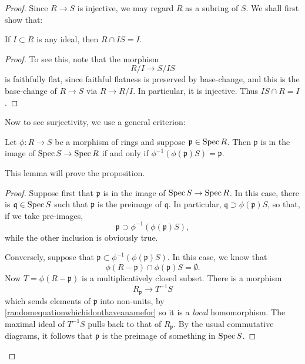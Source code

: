 \begin{proof} Since $R \to S$ is injective, we may regard $R$ as a subring of $S$.
We shall first show that:

\begin{lemma} \label{intideal}
If $I \subset R$ is any ideal, then $R \cap IS = I$.
\end{lemma}
\begin{proof} 
To see this, note that the morphism
\[ R/I \to S/IS  \]
is faithfully flat, since faithful flatness is preserved by base-change, and
this is the base-change of $R \to S$ via $R \to R/I$.
In particular, it is injective. Thus $IS \cap R = I$.
\end{proof} 


Now to see surjectivity, we use a general criterion:

\begin{lemma} \label{imagespec}
Let $\phi: R \to S$ be a morphism of rings and suppose $\mathfrak{p} \in \operatorname{Spec}
R$. Then $\mathfrak{p}$ is in the image of $\operatorname{Spec} S \to \operatorname{Spec} R$ if and only if 
$\phi^{-1}( \phi(\mathfrak{p}) S) = \mathfrak{p}$.
\end{lemma} 

This lemma will prove the proposition.
\begin{proof} 
Suppose first that $\mathfrak{p}$ is in the image of $\operatorname{Spec} S \to \operatorname{Spec} R$. In
this case, there is $\mathfrak{q} \in \operatorname{Spec} S$ such that
$ \mathfrak{p}$ is the preimage of $\mathfrak{q}$.
In particular, $\mathfrak{q} \supset \phi(\mathfrak{p})S$, so that, if we take
pre-images,
\[ \mathfrak{p} \supset \phi^{-1}(\phi(\mathfrak{p}) S),  \]
while the other inclusion is obviously true.

Conversely, suppose that $\mathfrak{p} \subset \phi^{-1}(\phi(\mathfrak{p})
S)$. In this case, we know that 
\[ \phi(R  - \mathfrak{p}) \cap \phi(\mathfrak{p})S = \emptyset.  \]
Now $T = \phi(R - \mathfrak{p})$ is a multiplicatively closed subset.
There is a morphism
\begin{equation} \label{randomequationwhichidonthaveanamefor}
R_{\mathfrak{p}} \to T^{-1}S 
\end{equation} 
which sends elements of $\mathfrak{p}$ into non-units, by
\eqref{randomequationwhichidonthaveanamefor} so it is a \emph{local}
homomorphism. The maximal ideal of $T^{-1} S$ pulls back to that of
$R_{\mathfrak{p}}$. By the usual commutative diagrams, it follows that
$\mathfrak{p}$ is the preimage of something in $\operatorname{Spec} S$.
\end{proof} 
\end{proof} 

